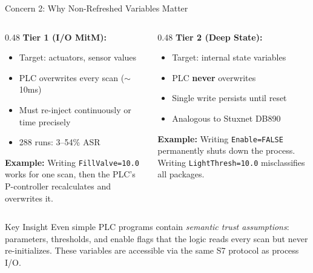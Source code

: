\documentclass[aspectratio=169,10pt]{beamer}
\begin{document}
\begin{frame}{Concern 2: Why Non-Refreshed Variables Matter}

\begin{columns}[T]
\begin{column}{0.48\textwidth}
\textbf{Tier 1 (I/O MitM):}
\begin{itemize}
    \item Target: actuators, sensor values
    \item PLC overwrites every scan ($\sim$10ms)
    \item Must re-inject continuously or time precisely
    \item 288 runs: 3--54\% ASR
\end{itemize}

\vspace{0.5em}
\textbf{Example:} Writing \texttt{FillValve=10.0} works for one scan, then the PLC's P-controller recalculates and overwrites it.
\end{column}

\begin{column}{0.48\textwidth}
\textbf{Tier 2 (Deep State):}
\begin{itemize}
    \item Target: internal state variables
    \item PLC \textbf{never} overwrites
    \item Single write persists until reset
    \item Analogous to Stuxnet DB890
\end{itemize}

\vspace{0.5em}
\textbf{Example:} Writing \texttt{Enable=FALSE} permanently shuts down the process. Writing \texttt{LightThresh=10.0} misclassifies all packages.
\end{column}
\end{columns}

\vspace{0.5em}
\begin{alertblock}{Key Insight}
Even simple PLC programs contain \emph{semantic trust assumptions}: parameters, thresholds, and enable flags that the logic reads every scan but never re-initializes. These variables are accessible via the same S7 protocol as process I/O.
\end{alertblock}
\end{frame}
\end{document}
